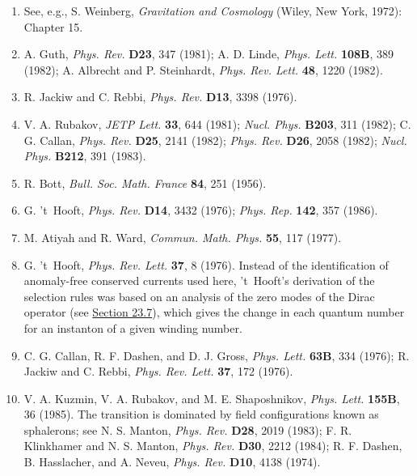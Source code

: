 \begin{enumerate}
\item {}\label{ch23-ref-18}
See, e.g., S. Weinberg, \emph{Gravitation and Cosmology} (Wiley,
New York, 1972): Chapter 15.

\item {}\label{ch23-ref-19}
A. Guth, \emph{Phys. Rev.} \textbf{D23}, 347 (1981); A. D. Linde,
\emph{Phys. Lett.} \textbf{108B}, 389 (1982); A. Albrecht and
P. Steinhardt, \emph{Phys. Rev. Lett.} \textbf{48}, 1220 (1982).

\item {}\label{ch23-ref-20}
R. Jackiw and C. Rebbi, \emph{Phys. Rev.} \textbf{D13}, 3398 (1976).

\item {}\label{ch23-ref-21}
V. A. Rubakov, \emph{JETP Lett.} \textbf{33}, 644 (1981);
\emph{Nucl. Phys.} \textbf{B203}, 311 (1982); C. G. Callan,
\emph{Phys. Rev.} \textbf{D25}, 2141 (1982); \emph{Phys. Rev.}
\textbf{D26}, 2058 (1982); \emph{Nucl. Phys.} \textbf{B212}, 391
(1983).

\item {}\label{ch23-ref-22}
R. Bott, \emph{Bull. Soc. Math. France} \textbf{84}, 251 (1956).

\item {}\label{ch23-ref-23}
G. 't~Hooft, \emph{Phys. Rev.} \textbf{D14}, 3432 (1976);
\emph{Phys. Rep.} \textbf{142}, 357 (1986).

\item {}\label{ch23-ref-24}
M. Atiyah and R. Ward, \emph{Commun. Math. Phys.} \textbf{55}, 117
(1977).

\item {}\label{ch23-ref-25}
G. 't~Hooft, \emph{Phys. Rev. Lett.} \textbf{37}, 8 (1976). Instead
of the identification of anomaly-free conserved currents used here,
't~Hooft's derivation of the selection rules was based on an analysis of
the zero modes of the Dirac operator (see
\hyperref[sec:23.7]{Section 23.7}), which gives the change in each quantum
number for an instanton of a given winding number.

\item {}\label{ch23-ref-26}
C. G. Callan, R. F. Dashen, and D. J. Gross, \emph{Phys. Lett.}
\textbf{63B}, 334 (1976); R. Jackiw and C. Rebbi,
\emph{Phys. Rev. Lett.} \textbf{37}, 172 (1976).

\item {}\label{ch23-ref-27}
V. A. Kuzmin, V. A. Rubakov, and M. E. Shaposhnikov,
\emph{Phys. Lett.} \textbf{155B}, 36 (1985). The transition is dominated
by field configurations known as sphalerons; see N. S. Manton,
\emph{Phys. Rev.} \textbf{D28}, 2019 (1983); F. R. Klinkhamer and
N. S. Manton, \emph{Phys. Rev.} \textbf{D30}, 2212 (1984);
R. F. Dashen, B. Hasslacher, and A. Neveu, \emph{Phys. Rev.}
\textbf{D10}, 4138 (1974).


\end{enumerate}
